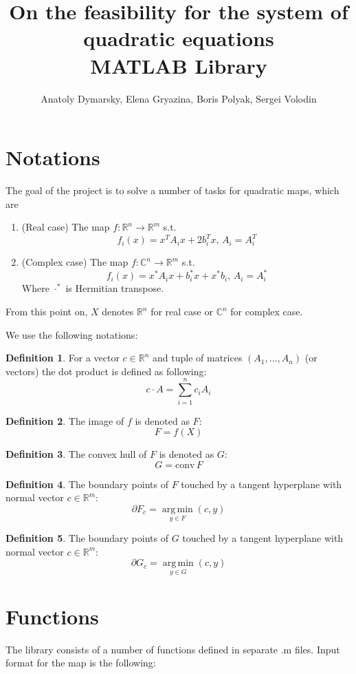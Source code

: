 \documentclass[a4paper]{article}
\title{On the feasibility for the system of quadratic equations\\MATLAB Library}
\date{}
\author{Anatoly Dymarsky, Elena Gryazina, Boris Polyak, Sergei Volodin}
\DeclareMathOperator*{\argmin}{arg\,min}
\newcommand{\conv}{\mbox{conv}\,}
\theoremstyle{definition}
\newtheorem{definition}{Definition}[section]
\begin{document}
\maketitle
\section{Notations}
The goal of the project is to solve a number of tasks for quadratic maps, which are
\begin{enumerate}
\item (Real case) The map $f\colon \mathbb{R}^n\to\mathbb{R}^m$ s.t. $$f_i(x)=x^TA_ix+2b_i^Tx,\, A_i=A_i^T$$
\item (Complex case) The map $f\colon \mathbb{C}^n\to\mathbb{R}^m$ s.t. $$f_i(x)=x^*A_ix+b_i^*x+x^*b_i,\, A_i=A_i^*$$
Where $\cdot^*$ is Hermitian transpose.
\end{enumerate}

From this point on, $X$ denotes $\mathbb{R}^n$ for real case or $\mathbb{C}^n$ for complex case.

We use the following notations:
\theoremstyle{definition}
\begin{definition} For a vector $c\in\mathbb{R}^n$ and tuple of matrices $(A_1,...,A_n)$ (or vectors) the dot product is defined as following: $$c\cdot A=\sum\limits_{i=1}^nc_iA_i$$
\end{definition}
\begin{definition} The image of $f$ is denoted as $F$:
	$$F=f(X)$$
\end{definition}
\begin{definition} The convex hull of $F$ is denoted as $G$:
	$$G=\conv F$$
\end{definition}
\begin{definition} The boundary points of $F$ touched by a tangent hyperplane with normal vector $c\in\mathbb{R}^m$:
	$$\partial F_c=\argmin\limits_{y\in F}(c,y)$$
\end{definition}
\begin{definition} The boundary points of $G$ touched by a tangent hyperplane with normal vector $c\in\mathbb{R}^m$:
	$$\partial G_c=\argmin\limits_{y\in G}(c,y)$$
\end{definition}
\section{Functions}
The library consists of a number of functions defined in separate .m files. Input format for the map is the following: 
\end{document}
